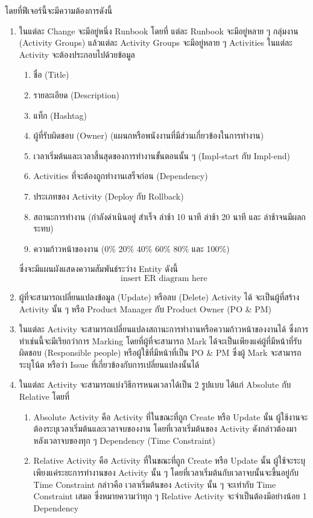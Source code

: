 โดยที่ฟีเจอร์นี้จะมีความต้องการดังนี้
\begin{enumerate}
    \item ในแต่ละ Change จะมีอยู่หนึ่ง Runbook โดยที่ แต่ละ Runbook จะมีอยู่หลาย ๆ กลุ่มงาน (Activity Groups) แล้วแต่ละ Activity Groups จะมีอยู่หลาย ๆ Activities ในแต่ละ Activity จะต้องประกอบไปด้วยข้อมูล 
    \begin{enumerate}
        \item ชื่อ (Title)
        \item รายละเอียด (Description) 
        \item แท็ก (Hashtag)
        \item ผู้ที่รับผิดชอบ (Owner) (แผนกหรือพนังงานที่มีส่วนเกี่ยวข้องในการทำงาน)
        \item เวลาเริ่มต้นและเวลาสิ้นสุดของการทำงานขั้นตอนนั้น ๆ (Impl-start กับ Impl-end)
        \item Activities ที่จะต้องถูกทำงานเสร็จก่อน (Dependency)
        \item ประเภทของ Activity (Deploy กับ Rollback)
        \item สถานะการทำงาน (กำลังดำเนินอยู่ สำเร็จ ล่าช้า 10 นาที ล่าช้า 20 นาที และ ล่าช้าจนมีผลกระทบ)
        \item ความก้าวหน้าของงาน (0\% 20\% 40\% 60\% 80\% และ 100\%)
    \end{enumerate}
    ซึ่งจะมีแผนผังแสดงความสัมพันธ์ระว่าง Entity ดังนี้
    \[\text{insert ER diagram here}\]
    \item ผู้ที่จะสามารถเปลี่ยนแปลงข้อมูล (Update) หรือลบ (Delete) Activity ได้ จะเป็นผู้ที่สร้าง Activity นั้น ๆ หรือ Product Manager กับ Product Owner (PO \& PM)
    \item ในแต่ละ Activity จะสามารถเปลี่ยนแปลงสถานะการทำงานหรือความก้าวหน้าของงานได้ ซึ่งการทำเช่นนี้จะมีเรียกว่าการ Marking โดยที่ผู้ที่จะสามารถ Mark ได้จะเป็นเพียงแค่ผู้ที่มีหน้าที่รับผิดชอบ (Responsible people) หรือผู้ใช้ที่มีหน้าที่เป็น PO \& PM ซึ่งผู้ Mark จะสามารถระบุโน้ต หรือว่า Issue ที่เกี่ยวข้องกับการเปลี่ยนแปลงนั้นได้
    \item ในแต่ละ Activity จะสามารถแบ่งวิธีการหนดเวลาได้เป็น 2 รูปแบบ ได้แก่ Absolute กับ Relative โดยที่ 
    \begin{enumerate}
        \item Absolute Activity คือ Activity ที่ในขณะที่ถูก Create หรือ Update นั้น ผู้ใช้งานจะต้องระบุเวลาเริ่มต้นและเวลาจบของงาน โดยที่เวลาเริ่มต้นของ Activity ดังกล่าวต้องมาหลังเวลาจบของทุก ๆ Dependency (Time Constraint)
        \item Relative Activity คือ Activity ที่ในขณะที่ถูก Create หรือ Update นั้น ผู้ใช้จะระบุเพียงแค่ระยะการทำงานของ Activity นั้น ๆ โดยที่เวลาเริ่มต้นกับเวลาจบนั้นจะขึ้นอยู่กับ Time Constraint กล่าวคือ เวลาเริ่มต้นของ Activity นั้น ๆ จะเท่ากับ Time Constraint เสมอ ซึ่งหมายความว่าทุก ๆ Relative Activity จะจำเป็นต้องมีอย่างน้อย 1 Dependency

\end{enumerate}
\end{enumerate}
